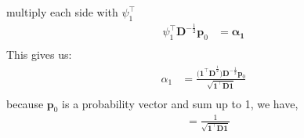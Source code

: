 \documentclass[11pt]{article}
\begin{document}
multiply each side with $\psi^\top _1$\\
\begin{equation*}
    \begin{split}
         \psi^\top _1\mathbf{D}^{-\frac{1}{2}}\mathbf{p}_0 &\mathbf{= \alpha_1} \\
    \end{split}
\end{equation*}
This gives us:
\begin{equation*}
    \begin{split}
        \alpha_1 &= \frac{\mathbf{(1^\top D}^{\frac{1}{2}})\mathbf{D}^{-\frac{1}{2}}\mathbf{p}_0}{\sqrt{\mathbf{1^\top D1}}} \\
    \end{split}
\end{equation*}
because $\mathbf{p}_0$ is a probability vector and sum up to 1, we have,
\begin{equation}
    \begin{split}
          &= \frac{1}{\mathbf{\sqrt{1^\top D1}}}
    \end{split}
\end{equation}
\end{document}
